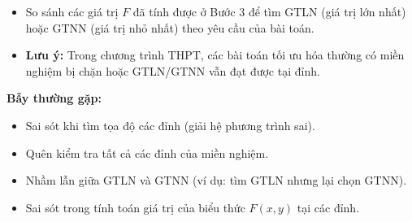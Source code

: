 \begin{phuongphap}
\begin{enumerate}
\begin{itemize}
        \item So sánh các giá trị $F$ đã tính được ở Bước 3 để tìm GTLN (giá trị lớn nhất) hoặc GTNN (giá trị nhỏ nhất) theo yêu cầu của bài toán.
        \item \textbf{Lưu ý:} Trong chương trình THPT, các bài toán tối ưu hóa thường có miền nghiệm bị chặn hoặc GTLN/GTNN vẫn đạt được tại đỉnh.
    \end{itemize}
\end{enumerate}
\textbf{Bẫy thường gặp:}
\begin{itemize}
    \item Sai sót khi tìm tọa độ các đỉnh (giải hệ phương trình sai).
    \item Quên kiểm tra tất cả các đỉnh của miền nghiệm.
    \item Nhầm lẫn giữa GTLN và GTNN (ví dụ: tìm GTLN nhưng lại chọn GTNN).
    \item Sai sót trong tính toán giá trị của biểu thức $F(x,y)$ tại các đỉnh.
\end{itemize}
\end{phuongphap}
